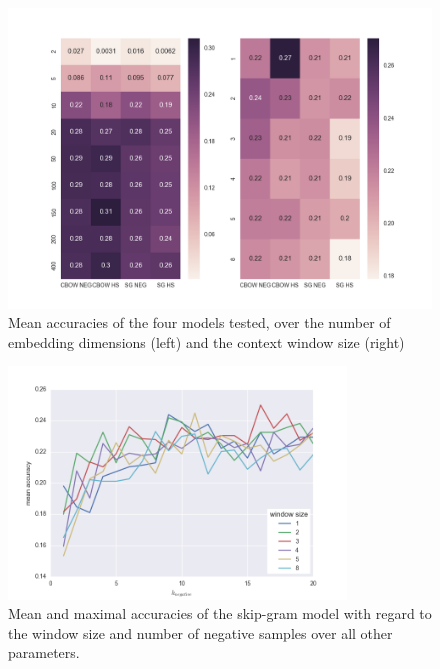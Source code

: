 \documentclass[11pt]{article}
\begin{document}
%
%
%
\begin{figure}[h!] %
   \centering
   \includegraphics[width=\textwidth]{4models_comparison_topn1_heatmap} 
   \caption{Mean accuracies of the four models tested, over the number of embedding dimensions (left) and the context window size (right)}
   \label{fig:4models_comparison_topn1_heatmap}
\end{figure}
%
%
\begin{figure}[h!] %
   \centering
   \includegraphics[width=0.8\textwidth]{acc_k_neg_vs_windowSize} 
   \caption{Mean and maximal accuracies of the skip-gram model with regard to the window size and number of negative samples over all other parameters.}
   \label{fig:acc_k_neg_vs_windowSize}
\end{figure}
\end{document}
